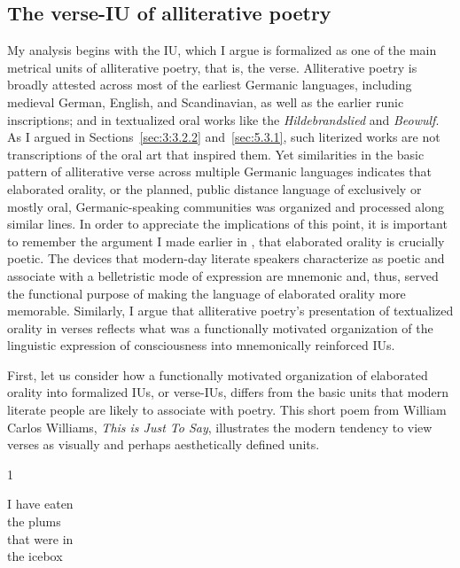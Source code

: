 \subsection{The verse-IU of alliterative poetry }\label{sec:6.2.1}
\begin{sloppypar}
My analysis begins with the IU, which I argue is formalized as one of the main metrical units of alliterative poetry, that is, the verse. Alliterative poetry is broadly attested across most of the earliest Germanic languages, including medieval German, English, and Scandinavian, as well as the earlier runic inscriptions; and in textualized oral works like the \textit{Hildebrandslied} and \textit{Beowulf}. As I argued in Sections~\ref{sec:3:3.2.2} and~\ref{sec:5.3.1}, such literized works are not transcriptions of the oral art that inspired them. Yet similarities in the basic pattern of alliterative verse across multiple Germanic languages indicates that elaborated orality, or the planned, public distance language of exclusively or mostly oral, Germanic-speaking communities was organized and processed along similar lines. In order to appreciate the implications of this point, it is important to remember the argument I made earlier in , that elaborated orality is crucially poetic. The devices that modern-day literate speakers characterize as poetic and associate with a belletristic mode of expression are mnemonic and, thus, served the functional purpose of making the language of elaborated orality more memorable. Similarly, I argue that alliterative poetry’s presentation of textualized orality in verses reflects what was a functionally motivated organization of the linguistic expression of consciousness into mnemonically reinforced IUs.
\end{sloppypar}

First, let us consider how a functionally motivated organization of elaborated orality into formalized IUs, or verse-IUs, differs from the basic units that modern literate people are likely to associate with poetry. This short poem from William Carlos Williams, \textit{This is Just To Say}, illustrates the modern tendency to view verses as visually and perhaps aesthetically defined units.

\ea%
    \label{ex:6:14}
1~  \parbox[t]{3cm}{I have eaten\\
                    the plums\\
                    that were in\\
                    the icebox
                    }\medskip

